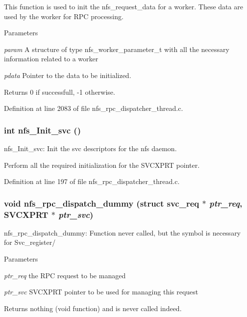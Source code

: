 This function is used to init the nfs\_\-request\_\-data for a worker. These data are used by the worker for RPC processing.


\begin{DoxyParams}{Parameters}
\item[{\em param}]A structure of type nfs\_\-worker\_\-parameter\_\-t with all the necessary information related to a worker \item[{\em pdata}]Pointer to the data to be initialized.\end{DoxyParams}
\begin{DoxyReturn}{Returns}
0 if successfull, -\/1 otherwise. 
\end{DoxyReturn}


Definition at line 2083 of file nfs\_\-rpc\_\-dispatcher\_\-thread.c.
\subsubsection[{nfs\_\-Init\_\-svc}]{\setlength{\rightskip}{0pt plus 5cm}int nfs\_\-Init\_\-svc ()}\label{nfs__rpc__dispatcher__thread_8c_a757bd493272d902a0cdb6c565b9c6135}
nfs\_\-Init\_\-svc: Init the svc descriptors for the nfs daemon.

Perform all the required initialization for the SVCXPRT pointer. 

Definition at line 197 of file nfs\_\-rpc\_\-dispatcher\_\-thread.c.
\subsubsection[{nfs\_\-rpc\_\-dispatch\_\-dummy}]{\setlength{\rightskip}{0pt plus 5cm}void nfs\_\-rpc\_\-dispatch\_\-dummy (struct svc\_\-req $\ast$ {\em ptr\_\-req}, \/  SVCXPRT $\ast$ {\em ptr\_\-svc})}\label{nfs__rpc__dispatcher__thread_8c_a545ee47faf1c9d08baa979e98749ef42}
nfs\_\-rpc\_\-dispatch\_\-dummy: Function never called, but the symbol is necessary for Svc\_\-register/


\begin{DoxyParams}{Parameters}
\item[{\em ptr\_\-req}]the RPC request to be managed \item[{\em ptr\_\-svc}]SVCXPRT pointer to be used for managing this request\end{DoxyParams}
\begin{DoxyReturn}{Returns}
nothing (void function) and is never called indeed. 
\end{DoxyReturn}



